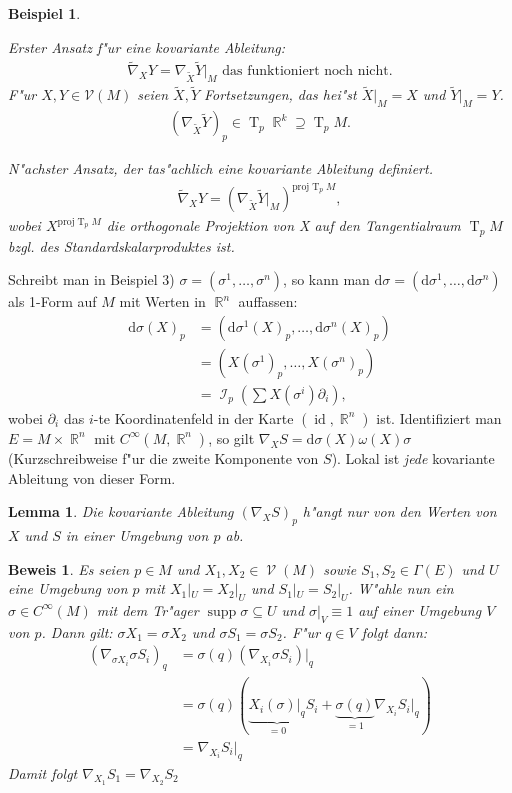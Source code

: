 \documentclass[paper=A4, twoside, chapterprefix=true, bibliography=totoc, headsepline]{scrbook}
\DeclareMathOperator{\R}{\mathbb{R}}
\DeclareMathOperator{\calI}{\mathcal{I}}
\DeclareMathOperator{\calV}{\mathcal{V}}
\DeclareMathOperator{\supp}{supp} %
\DeclareMathOperator{\Id}{id} %
\DeclareMathOperator{\T}{T} %
\newcommand{\dop}{\mathrm{d}}
\newcommand{\X}{\times}
\theoremstyle{plain}
\newtheorem{Lemma}[Dfn]{Lemma}
\theoremstyle{nonumberplain}
\newtheorem{bsp}{Beispiel}
\newtheorem{bew}{Beweis}
\theoremstyle{empty}
\theoremstyle{break}
\begin{document}
\begin{bsp}
\begin{enumerate}[label=(\arabic*),leftmargin=*]
    Erster Ansatz f"ur eine kovariante Ableitung:
    \begin{align*}
      \tilde \nabla_XY = \nabla_{\tilde X}\tilde Y|_M \text{ das funktioniert noch nicht.}
    \end{align*}
    F"ur $X,Y \in \mathcal V(M)$ seien $\tilde X, \tilde Y$ Fortsetzungen, das hei"st $\tilde X|_M = X$ und $\tilde Y|_M = Y$.
    \begin{align*}
      (\nabla_{\tilde X}\tilde Y)_p \in \T_p\R^k \supseteq \T_pM.
    \end{align*}

    N"achster Ansatz, der tas"achlich eine kovariante Ableitung definiert.
    \begin{align*}
      \tilde \nabla_XY = (\nabla_{\tilde X}\tilde Y|_M)^{\text{proj}\T_pM},
    \end{align*}
    wobei $X^{\text{proj}\T_pM}$ die orthogonale Projektion von X auf den Tangentialraum $\T_pM$ bzgl. des Standardskalarproduktes ist.
  \end{enumerate}
\end{bsp}

Schreibt man in Beispiel 3) $\sigma = ( \sigma^1, \ldots ,\sigma^n)$, so kann man $\dop \sigma = (\dop \sigma^1,\ldots ,\dop\sigma^n)$ als 1-Form auf $M$ mit Werten in $\R^n$ auffassen:
\begin{align*}
  \dop \sigma(X)_p &= (\dop \sigma^1(X)_p,\ldots , \dop \sigma^n(X)_p)\\
  &= (X(\sigma^1)_p,\ldots ,X(\sigma^n)_p)\\
  &= \calI_p(\sum X(\sigma^{i}) \partial_i),
\end{align*}
wobei $\partial_i$ das $i$-te Koordinatenfeld in der Karte $(\Id, \R^n)$ ist.
Identifiziert man $E = M \X \R^n$ mit $C^{\infty}(M, \R^n)$, so gilt $\nabla_X S = \dop \sigma(X) \omega(X) \sigma$ (Kurzschreibweise f"ur die zweite Komponente von $S$). 
Lokal ist \emph{jede} kovariante Ableitung von dieser Form.

\begin{Lemma}
  Die kovariante Ableitung $(\nabla_XS)_p$ h"angt nur von den Werten von $X$ und $S$ in einer Umgebung von $p$ ab.
\end{Lemma}

\begin{bew}
  Es seien $p \in M$ und $X_1, X_2 \in \calV(M)$ sowie $S_1, S_2 \in \Gamma(E)$ und $U$ eine Umgebung von $p$ mit $X_1|_U = X_2|_U$ und $S_1|_U = S_2|_U$. 
  W"ahle nun ein $\sigma \in C^{\infty}(M)$ mit dem Tr"ager $\supp \sigma \subseteq U$ und $\sigma|_V \equiv 1$ auf einer Umgebung $V$ von $p$.
  Dann gilt: $\sigma X_1 = \sigma X_2$ und $\sigma S_1 = \sigma S_2$. F"ur $q \in V$ folgt dann:
  \begin{align*}
    (\nabla_{\sigma X_i} \sigma S_i)_q &= \sigma(q)(\nabla_{X_i} \sigma S_i)|_q\\
    &= \sigma(q)(\underbrace{X_i(\sigma)|_q}_{=0} S_i + \underbrace{\sigma(q)}_{=1}\nabla_{X_i} S_i|_q)\\
    &= \nabla_{X_i} S_i|_q
  \end{align*}
  Damit folgt $\nabla_{X_1} S_1 = \nabla_{X_2} S_2$
\end{bew}
\end{document}
